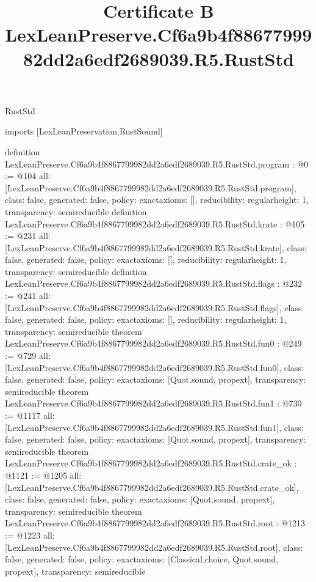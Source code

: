 \begin{lexlean}{RustStd}
\title{Certificate B LexLeanPreserve.Cf6a9b4f8867799982dd2a6edf2689039.R5.RustStd}
\begin{coremodule}
imports [LexLeanPreservation.RustSound]

definition LexLeanPreserve.Cf6a9b4f8867799982dd2a6edf2689039.R5.RustStd.program : @0 := @104 {
  all: [LexLeanPreserve.Cf6a9b4f8867799982dd2a6edf2689039.R5.RustStd.program],
  class: false,
  generated: false,
  policy: exact{axioms: []},
  reducibility: regular{height: 1},
  transparency: semireducible
}
definition LexLeanPreserve.Cf6a9b4f8867799982dd2a6edf2689039.R5.RustStd.krate : @105 := @231 {
  all: [LexLeanPreserve.Cf6a9b4f8867799982dd2a6edf2689039.R5.RustStd.krate],
  class: false,
  generated: false,
  policy: exact{axioms: []},
  reducibility: regular{height: 1},
  transparency: semireducible
}
definition LexLeanPreserve.Cf6a9b4f8867799982dd2a6edf2689039.R5.RustStd.flags : @232 := @241 {
  all: [LexLeanPreserve.Cf6a9b4f8867799982dd2a6edf2689039.R5.RustStd.flags],
  class: false,
  generated: false,
  policy: exact{axioms: []},
  reducibility: regular{height: 1},
  transparency: semireducible
}
theorem LexLeanPreserve.Cf6a9b4f8867799982dd2a6edf2689039.R5.RustStd.fun0 : @249 := @729 {
  all: [LexLeanPreserve.Cf6a9b4f8867799982dd2a6edf2689039.R5.RustStd.fun0],
  class: false,
  generated: false,
  policy: exact{axioms: [Quot.sound, propext]},
  transparency: semireducible
}
theorem LexLeanPreserve.Cf6a9b4f8867799982dd2a6edf2689039.R5.RustStd.fun1 : @730 := @1117 {
  all: [LexLeanPreserve.Cf6a9b4f8867799982dd2a6edf2689039.R5.RustStd.fun1],
  class: false,
  generated: false,
  policy: exact{axioms: [Quot.sound, propext]},
  transparency: semireducible
}
theorem LexLeanPreserve.Cf6a9b4f8867799982dd2a6edf2689039.R5.RustStd.crate_ok : @1121 := @1205 {
  all: [LexLeanPreserve.Cf6a9b4f8867799982dd2a6edf2689039.R5.RustStd.crate_ok],
  class: false,
  generated: false,
  policy: exact{axioms: [Quot.sound, propext]},
  transparency: semireducible
}
theorem LexLeanPreserve.Cf6a9b4f8867799982dd2a6edf2689039.R5.RustStd.root : @1213 := @1223 {
  all: [LexLeanPreserve.Cf6a9b4f8867799982dd2a6edf2689039.R5.RustStd.root],
  class: false,
  generated: false,
  policy: exact{axioms: [Classical.choice, Quot.sound, propext]},
  transparency: semireducible
}


\end{coremodule}
\end{lexlean}
